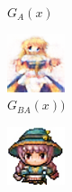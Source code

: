 \documentclass[twocolumn,11pt]{ctexart}
\begin{document}
\begin{figure}[htb]
\begin{subfigure}[b]{0.23\linewidth}
        \caption{$G_A(x)$}
      \end{subfigure}
      \begin{subfigure}[b]{0.23\linewidth}
        \includegraphics[width=\linewidth]{exp2_epoch060_rec_A.png}
        \caption{$G_{BA}(x))$}
      \end{subfigure}
      \begin{subfigure}[b]{0.23\linewidth}
        \includegraphics[width=\linewidth]{exp2_epoch060_idt_A.png}

\end{subfigure}
\end{figure}
\end{document}
